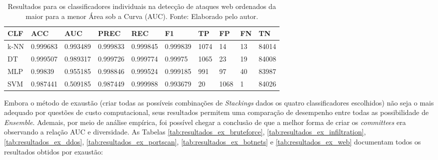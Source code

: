 \begin{longtable}{l|l|l|l|l|l|l|l|l|l}
\caption{Resultados para os classificadores individuais na detecção de ataques web ordenados da maior para a menor Área sob a Curva (AUC). Fonte: Elaborado pelo autor.}

\label{tab:resultados_ind_web}

\hline


\textbf{CLF} & \textbf{ACC} 		& \textbf{AUC}      & \textbf{PREC} 	 & \textbf{REC}            & \textbf{F1}       & \textbf{TP}   & \textbf{FP} & \textbf{FN}   & \textbf{TN}     \\ \hline \hline

k-NN & 0.999683 & 0.993489 & 0.999833 & 0.999845 & 0.999839 & 1074 & 14   & 13 & 84014 \\ \hline
DT   & 0.999507 & 0.989317 & 0.999726 & 0.999774 & 0.99975  & 1065 & 23   & 19 & 84008 \\ \hline
MLP  & 0.99839  & 0.955185 & 0.998846 & 0.999524 & 0.999185 & 991  & 97   & 40 & 83987 \\ \hline
SVM  & 0.987441 & 0.509185 & 0.987449 & 0.999988 & 0.993679 & 20   & 1068 & 1  & 84026 \\ \hline
\end{longtable}

Embora o método de exaustão (criar todas as possíveis combinações de \textit{Stackings} dados os quatro classificadores escolhidos) não seja o mais adequado por questões de custo computacional, seus resultados permitem uma comparação de desempenho entre todas as possibilidade de \textit{Ensemble}. Ademais, por meio de análise empírica, foi possível chegar a conclusão de que a melhor forma de criar os \textit{committees} era observando a relação AUC e diversidade. As Tabelas \ref{tab:resultados_ex_bruteforce}, \ref{tab:resultados_ex_infiltration}, \ref{tab:resultados_ex_ddos}, \ref{tab:resultados_ex_portscan}, \ref{tab:resultados_ex_botnets} e \ref{tab:resultados_ex_web} documentam todos os resultados obtidos por exaustão:




